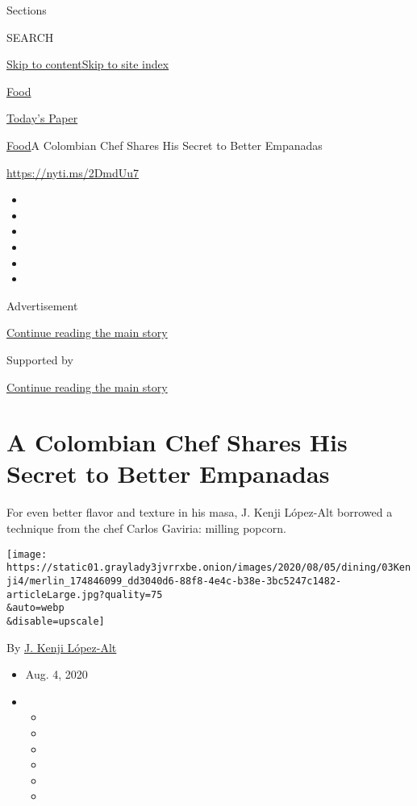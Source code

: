 Sections

SEARCH

\protect\hyperlink{site-content}{Skip to
content}\protect\hyperlink{site-index}{Skip to site index}

\href{https://www.nytimes3xbfgragh.onion/section/food}{Food}

\href{https://myaccount.nytimes3xbfgragh.onion/auth/login?response_type=cookie\&client_id=vi}{}

\href{https://www.nytimes3xbfgragh.onion/section/todayspaper}{Today's
Paper}

\href{/section/food}{Food}\textbar{}A Colombian Chef Shares His Secret
to Better Empanadas

\url{https://nyti.ms/2DmdUu7}

\begin{itemize}
\item
\item
\item
\item
\item
\item
\end{itemize}

Advertisement

\protect\hyperlink{after-top}{Continue reading the main story}

Supported by

\protect\hyperlink{after-sponsor}{Continue reading the main story}

\hypertarget{a-colombian-chef-shares-his-secret-to-better-empanadas}{%
\section{A Colombian Chef Shares His Secret to Better
Empanadas}\label{a-colombian-chef-shares-his-secret-to-better-empanadas}}

For even better flavor and texture in his masa, J. Kenji López-Alt
borrowed a technique from the chef Carlos Gaviria: milling popcorn.

\texttt{[image: https://static01.graylady3jvrrxbe.onion/images/2020/08/05/dining/03Kenji4/merlin\_174846099\_dd3040d6-88f8-4e4c-b38e-3bc5247c1482-articleLarge.jpg?quality=75\\\&auto=webp\\\&disable=upscale]}

By \href{https://www.nytimes3xbfgragh.onion/by/j-kenji-lopez-alt}{J.
Kenji López-Alt}

\begin{itemize}
\item
  Aug. 4, 2020
\item
  \begin{itemize}
  \item
  \item
  \item
  \item
  \item
  \item
  \end{itemize}
\end{itemize}

